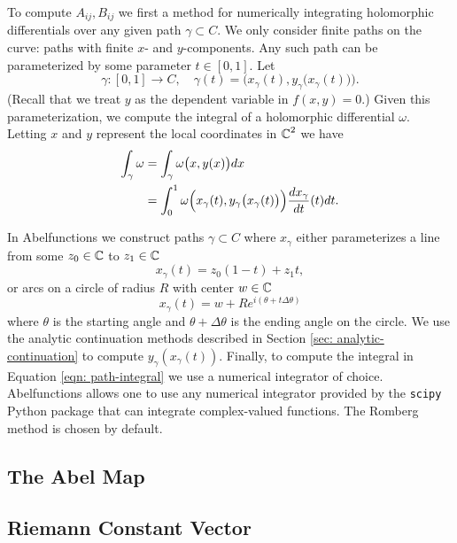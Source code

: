 To compute $A_{ij}, B_{ij}$ we first a method for numerically integrating
holomorphic differentials over any given path $\gamma \subset C$. We only
consider finite paths on the curve: paths with finite $x$- and $y$-components.
Any such path can be parameterized by some parameter $t \in [0,1]$. Let
\[
  \gamma : [0,1] \to C, \quad \gamma(t) = \Big( x_\gamma(t),
  y_\gamma\big(x_\gamma(t)\big) \Big).
\]
(Recall that we treat $y$ as the dependent variable in $f(x,y)=0$.) Given this
parameterization, we compute the integral of a holomorphic differential
$\omega$. Letting $x$ and $y$ represent the local coordinates in $\operatorname{\mathbb{C}}^2$ we have
\begin{align}
  \int_\gamma \omega
  &=
    \int_\gamma \omega\big(x,y(x)\big)dx \notag \\
  &=
    \int_0^1 \omega \Big(
    x_\gamma(t), y_\gamma\big(x_\gamma(t)\big) \Big)
    \frac{dx_\gamma}{dt}(t) dt. \label{eqn: path-integral}
\end{align}

In Abelfunctions we construct paths $\gamma \subset C$ where $x_\gamma$ either
parameterizes a line from some $z_0\in\operatorname{\mathbb{C}}$ to $z_1\in\operatorname{\mathbb{C}}$
\[
  x_\gamma(t) = z_0(1-t) + z_1t,
\]
or arcs on a circle of radius $R$ with center $w\in\operatorname{\mathbb{C}}$
\[
  x_\gamma(t) = w + Re^{i(\theta + t \Delta \theta)}
\]
where $\theta$ is the starting angle and $\theta + \Delta \theta$ is the ending
angle on the circle. We use the analytic continuation methods described in
Section \ref{sec: analytic-continuation} to compute $y_\gamma(x_\gamma(t))$.
Finally, to compute the integral in Equation \eqref{eqn: path-integral} we use a
numerical integrator of choice. Abelfunctions allows one to use any
numerical integrator provided by the {\tt scipy} Python package that can  %
integrate complex-valued functions. The Romberg method \cite{wiki:Romberg} is
chosen by default.


\subsection{The Abel Map}\label{subsec:abelfunctions-abel-map}


\subsection{Riemann Constant
  Vector}\label{subsec:abelfunctions-riemann-constant-vector}

